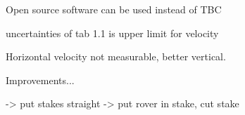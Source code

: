 Open source software can be used instead of TBC



uncertainties of tab 1.1 is upper limit for velocity

Horizontal velocity not measurable, better vertical.



Improvements...

-> put stakes straight
-> put rover in stake, cut stake